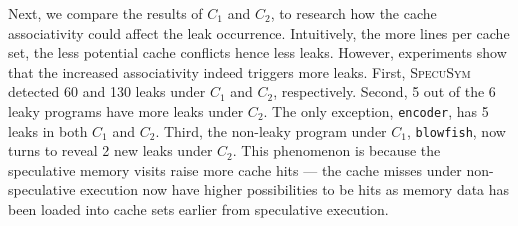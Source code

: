 \documentclass[sigconf]{acmart}
\newcommand{\SpecuSym}{\textsc{SpecuSym} }
\begin{document}
Next, we compare the results of $C_1$ and $C_2$, to research how the cache 
associativity could affect the leak occurrence. Intuitively, the more lines 
per cache set, the less potential cache conflicts hence less leaks. However, 
experiments show that the increased associativity indeed triggers more leaks. 
First, \SpecuSym detected 60 and 130 leaks under $C_1$ and $C_2$, respectively. 
Second, 5 out of the 6 leaky programs have more leaks under $C_2$. The only 
exception, \texttt{encoder}, has 5 leaks in both $C_1$ and $C_2$. Third, the 
non-leaky program under $C_1$, \texttt{blowfish}, now turns to reveal 2 new 
leaks under $C_2$. This phenomenon is because the speculative memory visits 
raise more cache hits --- the cache misses under non-speculative execution 
now have higher possibilities to be hits as memory data has been loaded into 
cache sets earlier from speculative execution. 
\end{document}
